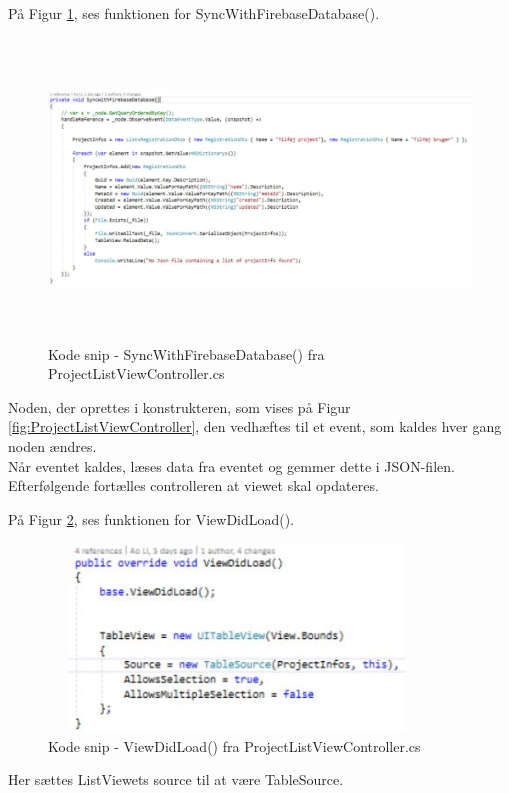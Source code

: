 På Figur \ref{fig:SyncWithDB}, ses funktionen for SyncWithFirebaseDatabase().
\begin{figure}[H] %
	\centering
	\includegraphics[height=8cm, width=15cm]{../ArkitekturDesign/Design/ProjectList/SyncWithDB}
	\caption{Kode snip - SyncWithFirebaseDatabase() fra ProjectListViewController.cs}
	\label{fig:SyncWithDB}
\end{figure}
Noden, der oprettes i konstrukteren, som vises på Figur \ref{fig:ProjectListViewController}, den vedhæftes til et event, som kaldes hver gang noden ændres. \\
Når eventet kaldes, læses data fra eventet og gemmer dette i JSON-filen. Efterfølgende fortælles controlleren at viewet skal opdateres.

På Figur \ref{fig:ViewDidLoad}, ses funktionen for ViewDidLoad().
\begin{figure}[H] %
	\centering
	\includegraphics[height=5cm, width=10cm]{../ArkitekturDesign/Design/ProjectList/ViewDidLoad}
	\caption{Kode snip - ViewDidLoad() fra ProjectListViewController.cs}
	\label{fig:ViewDidLoad}
\end{figure}
Her sættes ListViewets source til at være TableSource.

\clearpage

